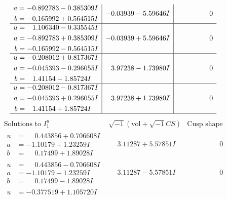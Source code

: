 \documentclass[1p]{elsarticle_modified}
\theoremstyle{definition}
\newcommand{\I}{\sqrt{-1}}
\begin{document}
$$\begin{array}{c|c|c}
\begin{aligned}
a &= -0.892783 - 0.385309 I \\
b &= -0.165992 + 0.564515 I\end{aligned}
 & -0.03939 - 5.59646 I & \phantom{-0.000000 } 0 \\ \hline\begin{aligned}
u &= \phantom{-}1.106340 - 0.335545 I \\
a &= -0.892783 + 0.385309 I \\
b &= -0.165992 - 0.564515 I\end{aligned}
 & -0.03939 + 5.59646 I & \phantom{-0.000000 } 0 \\ \hline\begin{aligned}
u &= -0.208012 + 0.817367 I \\
a &= -0.045393 - 0.296055 I \\
b &= \phantom{-}1.41154 - 1.85724 I\end{aligned}
 & \phantom{-}3.97238 - 1.73980 I & \phantom{-0.000000 } 0 \\ \hline\begin{aligned}
u &= -0.208012 - 0.817367 I \\
a &= -0.045393 + 0.296055 I \\
b &= \phantom{-}1.41154 + 1.85724 I\end{aligned}
 & \phantom{-}3.97238 + 1.73980 I & \phantom{-0.000000 } 0\\
 \hline 
 \end{array}$$\newpage$$\begin{array}{c|c|c}  
\text{Solutions to }I^u_{1}& \I (\text{vol} + \sqrt{-1}CS) & \text{Cusp shape}\\
 \hline 
\begin{aligned}
u &= \phantom{-}0.443856 + 0.706608 I \\
a &= -1.10179 + 1.23259 I \\
b &= \phantom{-}0.17499 + 1.89028 I\end{aligned}
 & \phantom{-}3.11287 + 5.57851 I & \phantom{-0.000000 } 0 \\ \hline\begin{aligned}
u &= \phantom{-}0.443856 - 0.706608 I \\
a &= -1.10179 - 1.23259 I \\
b &= \phantom{-}0.17499 - 1.89028 I\end{aligned}
 & \phantom{-}3.11287 - 5.57851 I & \phantom{-0.000000 } 0 \\ \hline\begin{aligned}
u &= -0.377519 + 1.105720 I \\

\end{aligned}
\end{array}$$
\end{document}
